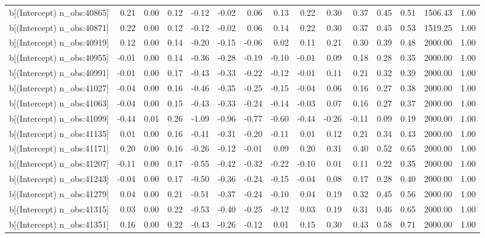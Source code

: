 \begin{table}[ht]
\begin{tabular}{rrrrrrrrrrrrrrr}
  b[(Intercept) n\_obs:40865] & 0.21 & 0.00 & 0.12 & -0.12 & -0.02 & 0.06 & 0.13 & 0.22 & 0.30 & 0.37 & 0.45 & 0.51 & 1506.43 & 1.00 \\ 
  b[(Intercept) n\_obs:40871] & 0.22 & 0.00 & 0.12 & -0.12 & -0.02 & 0.06 & 0.14 & 0.22 & 0.30 & 0.37 & 0.45 & 0.53 & 1519.25 & 1.00 \\ 
  b[(Intercept) n\_obs:40919] & 0.12 & 0.00 & 0.14 & -0.20 & -0.15 & -0.06 & 0.02 & 0.11 & 0.21 & 0.30 & 0.39 & 0.48 & 2000.00 & 1.00 \\ 
  b[(Intercept) n\_obs:40955] & -0.01 & 0.00 & 0.14 & -0.36 & -0.28 & -0.19 & -0.10 & -0.01 & 0.09 & 0.18 & 0.28 & 0.35 & 2000.00 & 1.00 \\ 
  b[(Intercept) n\_obs:40991] & -0.01 & 0.00 & 0.17 & -0.43 & -0.33 & -0.22 & -0.12 & -0.01 & 0.11 & 0.21 & 0.32 & 0.39 & 2000.00 & 1.00 \\ 
  b[(Intercept) n\_obs:41027] & -0.04 & 0.00 & 0.16 & -0.46 & -0.35 & -0.25 & -0.15 & -0.04 & 0.06 & 0.16 & 0.27 & 0.38 & 2000.00 & 1.00 \\ 
  b[(Intercept) n\_obs:41063] & -0.04 & 0.00 & 0.15 & -0.43 & -0.33 & -0.24 & -0.14 & -0.03 & 0.07 & 0.16 & 0.27 & 0.37 & 2000.00 & 1.00 \\ 
  b[(Intercept) n\_obs:41099] & -0.44 & 0.01 & 0.26 & -1.09 & -0.96 & -0.77 & -0.60 & -0.44 & -0.26 & -0.11 & 0.09 & 0.19 & 2000.00 & 1.00 \\ 
  b[(Intercept) n\_obs:41135] & 0.01 & 0.00 & 0.16 & -0.41 & -0.31 & -0.20 & -0.11 & 0.01 & 0.12 & 0.21 & 0.34 & 0.43 & 2000.00 & 1.00 \\ 
  b[(Intercept) n\_obs:41171] & 0.20 & 0.00 & 0.16 & -0.26 & -0.12 & -0.01 & 0.09 & 0.20 & 0.31 & 0.40 & 0.52 & 0.65 & 2000.00 & 1.00 \\ 
  b[(Intercept) n\_obs:41207] & -0.11 & 0.00 & 0.17 & -0.55 & -0.42 & -0.32 & -0.22 & -0.10 & 0.01 & 0.11 & 0.22 & 0.35 & 2000.00 & 1.00 \\ 
  b[(Intercept) n\_obs:41243] & -0.04 & 0.00 & 0.17 & -0.50 & -0.36 & -0.24 & -0.15 & -0.04 & 0.08 & 0.17 & 0.28 & 0.40 & 2000.00 & 1.00 \\ 
  b[(Intercept) n\_obs:41279] & 0.04 & 0.00 & 0.21 & -0.51 & -0.37 & -0.24 & -0.10 & 0.04 & 0.19 & 0.32 & 0.45 & 0.56 & 2000.00 & 1.00 \\ 
  b[(Intercept) n\_obs:41315] & 0.03 & 0.00 & 0.22 & -0.53 & -0.40 & -0.25 & -0.12 & 0.03 & 0.19 & 0.31 & 0.46 & 0.65 & 2000.00 & 1.00 \\ 
  b[(Intercept) n\_obs:41351] & 0.16 & 0.00 & 0.22 & -0.43 & -0.26 & -0.12 & 0.01 & 0.15 & 0.30 & 0.43 & 0.58 & 0.71 & 2000.00 & 1.00 \\ 

\end{tabular}
\end{table}
